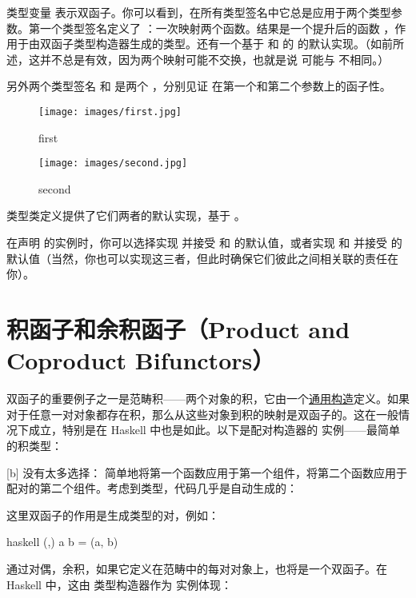 类型变量  表示双函子。你可以看到，在所有类型签名中它总是应用于两个类型参数。第一个类型签名定义了 ：一次映射两个函数。结果是一个提升后的函数 ，作用于由双函子类型构造器生成的类型。还有一个基于  和  的  的默认实现。（如前所述，这并不总是有效，因为两个映射可能不交换，也就是说  可能与  不相同。）

\noindent
另外两个类型签名  和  是两个 ，分别见证  在第一个和第二个参数上的函子性。

\begin{figure}[H]
  \centering
  \begin{minipage}{0.45\textwidth}
    \centering
    \texttt{[image: images/first.jpg]} %
    \caption{first}
  \end{minipage}\hfill
  \begin{minipage}{0.45\textwidth}
    \centering
    \texttt{[image: images/second.jpg]} %
    \caption{second}
  \end{minipage}
\end{figure}

\noindent
类型类定义提供了它们两者的默认实现，基于 。

在声明  的实例时，你可以选择实现  并接受  和  的默认值，或者实现  和  并接受  的默认值（当然，你也可以实现这三者，但此时确保它们彼此之间相关联的责任在你）。

\section{积函子和余积函子（Product and Coproduct Bifunctors）}

双函子的重要例子之一是范畴积——两个对象的积，它由一个\hyperref[products-and-coproducts]{通用构造}定义。如果对于任意一对对象都存在积，那么从这些对象到积的映射是双函子的。这在一般情况下成立，特别是在 Haskell 中也是如此。以下是配对构造器的  实例——最简单的积类型：

[b]
没有太多选择： 简单地将第一个函数应用于第一个组件，将第二个函数应用于配对的第二个组件。考虑到类型，代码几乎是自动生成的：

这里双函子的作用是生成类型的对，例如：

\begin{snip}{haskell}
(,) a b = (a, b)
\end{snip}
通过对偶，余积，如果它定义在范畴中的每对对象上，也将是一个双函子。在 Haskell 中，这由  类型构造器作为  实例体现：

